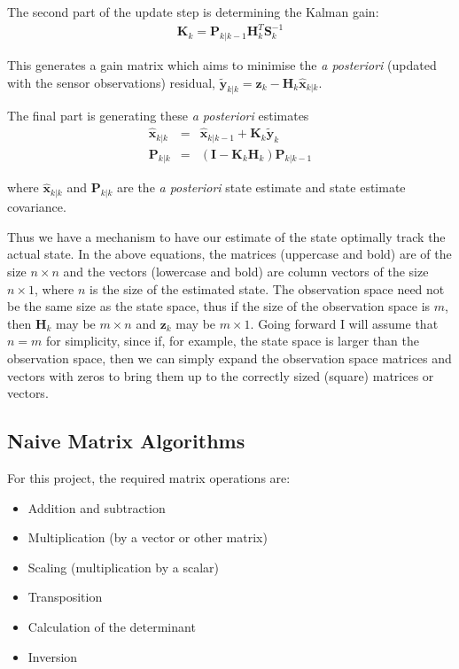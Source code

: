 \documentclass[12pt]{article}
\begin{document}
The second part of the update step is determining the Kalman gain:
\begin{eqnarray}
	\mathbf{K}_k = \mathbf{P}_{k|k-1} \mathbf{H}^T_k \mathbf{S}^{-1}_k
\end{eqnarray}

\noindent This generates a gain matrix which aims to minimise the \emph{a posteriori} (updated with the sensor observations) residual, $\mathbf{\tilde{y}}_{k|k} = \mathbf{z}_k - \mathbf{H}_k \mathbf{\hat{x}}_{k|k}$.

The final part is generating these \emph{a posteriori} estimates
\begin{eqnarray}
	\mathbf{\hat{x}}_{k|k} &=& \mathbf{\hat{x}}_{k|k-1} + \mathbf{K}_k \mathbf{\tilde{y}}_k \\
	\mathbf{P}_{k|k} &=& (\mathbf{I} - \mathbf{K}_k \mathbf{H}_k)\mathbf{P}_{k|k-1}
\end{eqnarray}

\noindent where $\mathbf{\hat{x}}_{k|k}$ and $\mathbf{P}_{k|k}$ are the \emph{a posteriori} state estimate and state estimate covariance.

Thus we have a mechanism to have our estimate of the state optimally track the actual state. In the above equations, the matrices (uppercase and bold) are of the size $n \times n$ and the vectors (lowercase and bold) are column vectors of the size $n \times 1$, where $n$ is the size of the estimated state. The observation space need not be the same size as the state space, thus if the size of the observation space is $m$, then $\mathbf{H}_k$ may be $m \times n$ and $\mathbf{z}_k$ may be $m \times 1$. Going forward I will assume that $n = m$ for simplicity, since if, for example, the state space is larger than the observation space, then we can simply expand the observation space matrices and vectors with zeros to bring them up to the correctly sized (square) matrices or vectors.

\subsection{Naive Matrix Algorithms}
\label{naive}

For this project, the required matrix operations are:

\begin{itemize}
	\item Addition and subtraction
	\item Multiplication (by a vector or other matrix)
	\item Scaling (multiplication by a scalar)
	\item Transposition
	\item Calculation of the determinant
	\item Inversion
\end{itemize}
\end{document}
